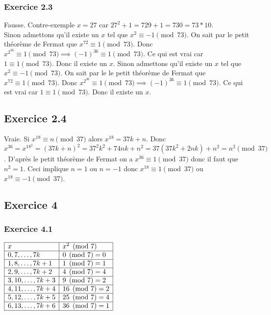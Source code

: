 \documentclass[]{book}
\theoremstyle{definition}
\begin{document}
\subsubsection*{Exercice 2.3}
Fausse. Contre-exemple $x=27$ car $27^2 + 1 = 729+1 = 730 = 73*10$. \\
Sinon admettons qu'il existe un $x$ tel que $x^2 \equiv -1 \pmod{73}$. On sait par le petit th\'eor\`eme de Fermat que $x^{72} \equiv 1 \pmod{73}$. Donc $x^{2^{36}}	 \equiv 1 \pmod{73} \implies (-1)^{36} \equiv 1 \pmod{73}$. Ce qui est vrai car $1 \equiv 1 \pmod{73}$. Donc il existe un $x$.
Sinon admettons qu'il existe un $x$ tel que $x^2 \equiv -1 \pmod{73}$. On sait par le le petit th\'eor\`eme de Fermat que $x^72 \equiv 1 \pmod{73}$. Donc $x^{2^36} \equiv 1 \pmod{73} \implies (-1)^{36} \equiv 1 \pmod{73}$. Ce qui est vrai car $1 \equiv 1 \pmod{73}$. Donc il existe un $x$.

\subsection*{Exercice 2.4}
Vraie. Si $x^18 \equiv n \pmod{37}$ alors $x^18 = 37k+n$. Donc $x^36 = x^{18^2} = (37k+n)^2 = 37^2k^2 + 74nk + n^2 = 37(37k^2+2nk) + n^2 = n^2 \pmod{37}$. D'apr\`es le petit th\'eor\`eme de Fermat on a $x^{36} 	 \equiv 1 \pmod{37}$ donc il faut que $n^2 = 1$. Ceci implique $n=1$ ou $n=-1$ donc
$x^18 \equiv 1 \pmod{37}$ ou $x^{18} \equiv -1 \pmod{37}$.

\subsection*{Exercice 4}
\subsubsection*{Exercice 4.1}
$
\begin{array}{|l|l|}
\hline
x & x^2 \pmod{7} \\
\hline
0,7,\ldots,7k & 0 \pmod{7} = 0  \\
\hline
1,8,\ldots,7k+1 & 1 \pmod{7} = 1 \\
\hline
2,9,\ldots,7k+2 & 4 \pmod{7} = 4 \\
\hline
3,10,\ldots,7k+3 & 9 \pmod{7} = 2 \\
\hline
4,11,\ldots,7k+4 & 16 \pmod{7} = 2 \\
\hline
5,12,\ldots,7k+5 & 25 \pmod{7} = 4 \\
\hline
6,13,\ldots,7k+6 & 36 \pmod{7} = 1 \\
\hline
\end{array}
$
\end{document}
